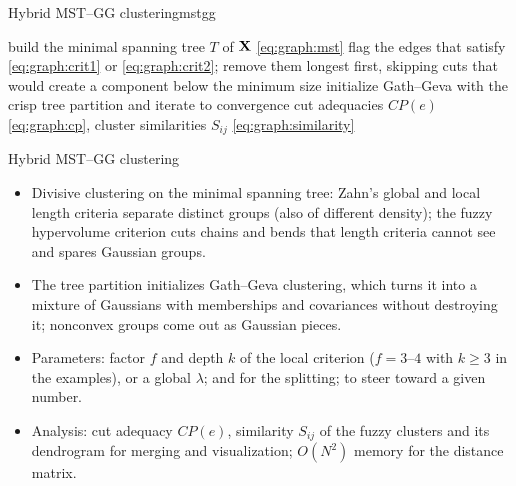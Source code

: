 \begin{algobox}{Hybrid MST--GG clustering}{mstgg}
\begin{algorithm}[H]
build the minimal spanning tree $T$ of $\mathbf{X}$ \eqref{eq:graph:mst}\;
flag the edges that satisfy \eqref{eq:graph:crit1} or \eqref{eq:graph:crit2}; remove them longest first, skipping cuts that would create a component below the minimum size\;
initialize Gath--Geva with the crisp tree partition and iterate to convergence\;
cut adequacies $CP(e)$ \eqref{eq:graph:cp}, cluster similarities $S_{ij}$ \eqref{eq:graph:similarity}\;
\end{algorithm}
\end{algobox}
\begin{summarybox}{Hybrid MST--GG clustering}
\begin{itemize}
  \item Divisive clustering on the minimal spanning tree: Zahn's global and local length criteria separate distinct groups (also of different density); the fuzzy hypervolume criterion cuts chains and bends that length criteria cannot see and spares Gaussian groups.
  \item The tree partition initializes Gath--Geva clustering, which turns it into a mixture of Gaussians with memberships and covariances without destroying it; nonconvex groups come out as Gaussian pieces.
  \item Parameters: factor $f$ and depth $k$ of the local criterion ($f=3$--$4$ with $k\ge3$ in the examples), or a global $\lambda$;  and  for the splitting;  to steer toward a given number.
  \item Analysis: cut adequacy $CP(e)$, similarity $S_{ij}$ of the fuzzy clusters and its dendrogram for merging and visualization; $O(N^2)$ memory for the distance matrix.
\end{itemize}
\end{summarybox}

